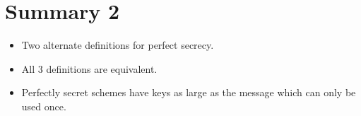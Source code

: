     \section{Summary 2}
    	\begin{itemize}
    		\item Two alternate definitions for perfect secrecy.
    		\item All 3 definitions are equivalent.
    		\item Perfectly secret schemes have keys as large as the message which can only be used once.
    	\end{itemize}
    
    
    \newpage
    
    
    
    
    
    
    
    
    
    
    
    
    
    
    
    
    
    
    
    
    
    
    
    
    
    
    
    
    
    